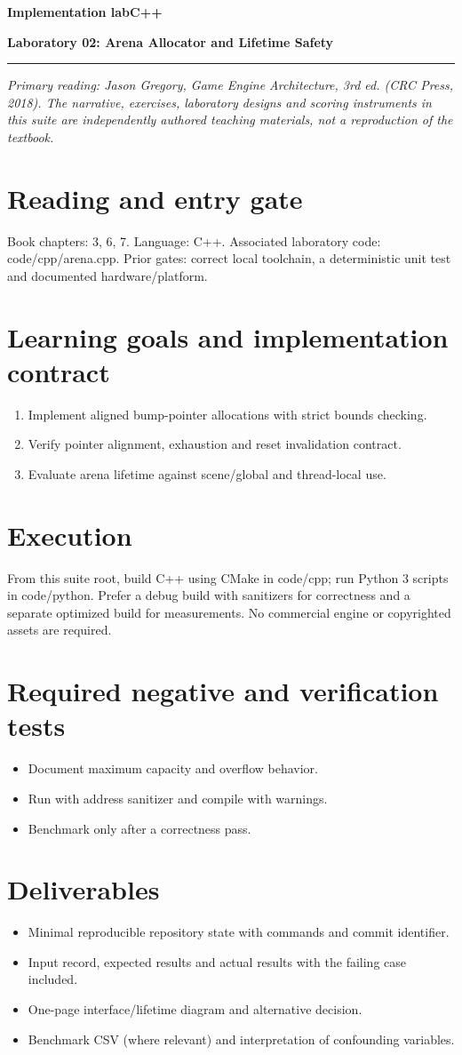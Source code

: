 \documentclass[11pt,letterpaper]{article}
\newcommand{\DocType}{Reference}
\newcommand{\SuiteHeading}[3]{%
\renewcommand{\DocType}{#2}%
{\small\bfseries\sffamily\color{EngineTeal}#2\hfill #3}\par\vspace{6pt}
{\LARGE\bfseries\color{EngineBlue}#1}\par\vspace{4pt}
{\color{EngineTeal}\rule{\linewidth}{1pt}}\par\vspace{7pt}}
\newcommand{\SourceNote}{\footnotesize\textit{Primary reading: Jason Gregory, \emph{Game Engine Architecture}, 3rd ed. (CRC Press, 2018). The narrative, exercises, laboratory designs and scoring instruments in this suite are independently authored teaching materials, not a reproduction of the textbook.}\normalsize\par}
\begin{document}
\SuiteHeading{Laboratory 02: Arena Allocator and Lifetime Safety}{Implementation lab}{C++}
\SourceNote
\section{Reading and entry gate}
Book chapters: 3, 6, 7. Language: C++. Associated laboratory code: code/cpp/arena.cpp. Prior gates: correct local toolchain, a deterministic unit test and documented hardware/platform.

\section{Learning goals and implementation contract}
\begin{enumerate}
\item Implement aligned bump-pointer allocations with strict bounds checking.
\item Verify pointer alignment, exhaustion and reset invalidation contract.
\item Evaluate arena lifetime against scene/global and thread-local use.
\end{enumerate}
\section{Execution}
From this suite root, build C++ using CMake in code/cpp; run Python 3 scripts in code/python. Prefer a debug build with sanitizers for correctness and a separate optimized build for measurements. No commercial engine or copyrighted assets are required.

\section{Required negative and verification tests}
\begin{itemize}
\item Document maximum capacity and overflow behavior.
\item Run with address sanitizer and compile with warnings.
\item Benchmark only after a correctness pass.
\end{itemize}
\section{Deliverables}
\begin{itemize}
\item Minimal reproducible repository state with commands and commit identifier.
\item Input record, expected results and actual results with the failing case included.
\item One-page interface/lifetime diagram and alternative decision.
\item Benchmark CSV (where relevant) and interpretation of confounding variables.
\end{itemize}
\end{document}
